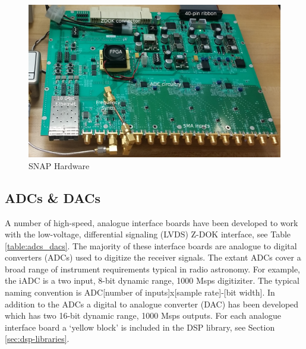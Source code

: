 \documentclass{ws-jai}
\begin{document}
\begin{figure}[h]
\centering
\includegraphics[width=150mm, scale=0.5]{snap_hw}
\caption{SNAP Hardware}
\label{fig:snap_hw}
\end{figure}

\subsection{ADCs \& DACs}

A number of high-speed, analogue interface boards have been developed to work
with the low-voltage, differential signaling (LVDS) Z-DOK interface, see Table
\ref{table:adcs_dacs}. The majority of these interface boards are analogue to
digital converters (ADCs) used to digitize the receiver signals. The extant ADCs
cover a broad range of instrument requirements typical in radio
astronomy. For example, the iADC is a two input, 8-bit dynamic range, 1000 Msps
digitiziter. The typical naming convention is ADC[number of inputs]x[sample
rate]-[bit width]. In addition to the ADCs a digital to analogue converter (DAC)
has been developed which has two 16-bit dynamic range, 1000 Msps outputs. For
each analogue interface board a `yellow block' is included in the DSP library,
see Section \ref{sec:dsp-libraries}.
\end{document}
